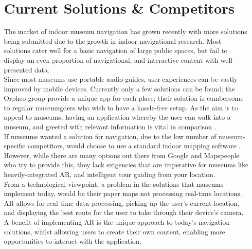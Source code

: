 
\section{Current Solutions \& Competitors}
The market of indoor museum navigation has grown recently with more solutions being submitted due to the growth in indoor navigational research. Most solutions cater well for a basic navigation of large public spaces, but fail to display an even proportion of navigational, and interactive content with well-presented data.\\

Since most museums use portable audio guides, user experiences can be vastly improved by mobile devices. Currently only a few solutions can be found; the Orpheo group \cite{orpheo} provide a unique app for each place; their solution is cumbersome to regular museumgoers who wish to have a hassle-free setup. As the aim is to appeal to museums, having an application whereby the user can walk into a museum, and greeted with relevant information is vital in comparison \cite{microsoft}.\\

If museums wanted a solution for navigation, due to the low number of museum-specific competitors, would choose to use a standard indoor mapping software \cite{engadget}. However, while there are many options out there from Google and Mapspeople \cite{mapspeople} who try to provide this, they lack exigencies that are imperative for museums like heavily-integrated AR, and intelligent tour guiding from your location.\\ 

From a technological viewpoint, a problem in the solutions that museums implement today, would be their paper maps not processing real-time locations. AR allows for real-time data processing, picking up the user's current location, and displaying the best route for the user to take through their device's camera. A benefit of implementing AR is the unique approach to today's navigation solutions, whilst allowing users to create their own content, enabling more opportunities to interact with the application.